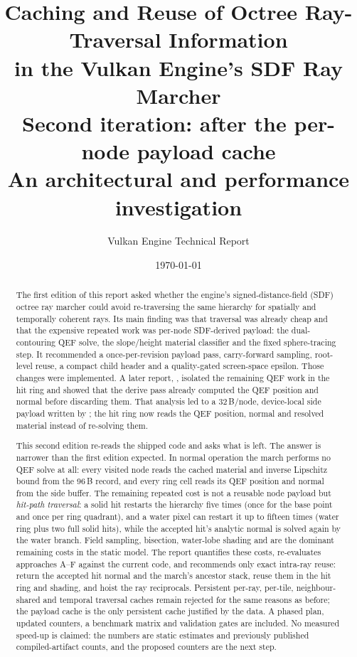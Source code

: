 \documentclass[11pt,a4paper]{article}
\title{\textbf{Caching and Reuse of Octree Ray-Traversal Information\\
in the Vulkan Engine's SDF Ray Marcher}\\[6pt]
{\large Second iteration: after the per-node payload cache}\\[4pt]
{\normalsize An architectural and performance investigation}}
\author{Vulkan Engine Technical Report}
\date{\today}
\DeclareRobustCommand{\fpath}[1]{\path{#1}}
\newcommand{\code}[1]{\texttt{\detokenize{#1}}}
\theoremstyle{plain}
\theoremstyle{definition}
\theoremstyle{remark}
\begin{document}
\maketitle

\begin{abstract}
The first edition of this report asked whether the engine's signed-distance-field
(SDF) octree ray marcher could avoid re-traversing the same hierarchy for
spatially and temporally coherent rays. Its main finding was that traversal was
already cheap and that the expensive repeated work was per-node SDF-derived
payload: the dual-contouring QEF solve, the slope/height material classifier and
the fixed sphere-tracing step. It recommended a once-per-revision payload pass,
carry-forward sampling, root-level reuse, a compact child header and a
quality-gated screen-space epsilon. Those changes were implemented. A later
report, \fpath{docs/qef_gpu.tex}, isolated the remaining QEF work in the hit
ring and showed that the derive pass already computed the QEF position and
normal before discarding them. That analysis led to a 32\,B/node, device-local
side payload written by \fpath{OctreeDerive.comp}; the hit ring now reads the
QEF position, normal and resolved material instead of re-solving them.

This second edition re-reads the shipped code and asks what is left. The answer
is narrower than the first edition expected. In normal operation the march
performs no QEF solve at all: every visited node reads the cached material and
inverse Lipschitz bound from the 96\,B record, and every ring cell reads its QEF
position and normal from the side buffer. The remaining repeated cost is not a
reusable node payload but \emph{hit-path traversal}: a solid hit restarts the
hierarchy five times (once for the base point and once per ring quadrant), and a
water pixel can restart it up to fifteen times (water ring plus two full solid
hits), while the accepted hit's analytic normal is solved again by the water
branch. Field sampling, bisection, water-lobe shading and \code{shadeSolidSurface}
are the dominant remaining costs in the static model. The report quantifies
these costs, re-evaluates
approaches A--F against the current code, and recommends only exact intra-ray
reuse: return the accepted hit normal and the march's ancestor stack, reuse them
in the hit ring and shading, and hoist the ray reciprocals. Persistent per-ray,
per-tile, neighbour-shared and temporal traversal caches remain rejected for the
same reasons as before; the payload cache is the only persistent cache justified
by the data. A phased plan, updated counters, a benchmark matrix and validation
gates are included. No measured speed-up is claimed: the numbers are static
estimates and previously published compiled-artifact counts, and the proposed
counters are the next step.
\end{abstract}
\end{document}
